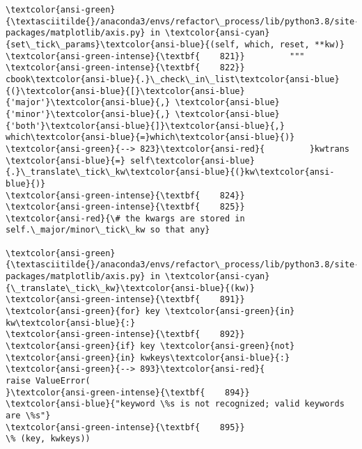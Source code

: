 \documentclass[11pt]{article}
\begin{document}
\begin{Verbatim}[commandchars=\\\{\}, frame=single, framerule=2mm, rulecolor=\color{outerrorbackground}]
\textcolor{ansi-green}{\textasciitilde{}/anaconda3/envs/refactor\_process/lib/python3.8/site-packages/matplotlib/axis.py} in \textcolor{ansi-cyan}{set\_tick\_params}\textcolor{ansi-blue}{(self, which, reset, **kw)}
\textcolor{ansi-green-intense}{\textbf{    821}}         """
\textcolor{ansi-green-intense}{\textbf{    822}}         cbook\textcolor{ansi-blue}{.}\_check\_in\_list\textcolor{ansi-blue}{(}\textcolor{ansi-blue}{[}\textcolor{ansi-blue}{'major'}\textcolor{ansi-blue}{,} \textcolor{ansi-blue}{'minor'}\textcolor{ansi-blue}{,} \textcolor{ansi-blue}{'both'}\textcolor{ansi-blue}{]}\textcolor{ansi-blue}{,} which\textcolor{ansi-blue}{=}which\textcolor{ansi-blue}{)}
\textcolor{ansi-green}{--> 823}\textcolor{ansi-red}{         }kwtrans \textcolor{ansi-blue}{=} self\textcolor{ansi-blue}{.}\_translate\_tick\_kw\textcolor{ansi-blue}{(}kw\textcolor{ansi-blue}{)}
\textcolor{ansi-green-intense}{\textbf{    824}} 
\textcolor{ansi-green-intense}{\textbf{    825}}         \textcolor{ansi-red}{\# the kwargs are stored in self.\_major/minor\_tick\_kw so that any}

\textcolor{ansi-green}{\textasciitilde{}/anaconda3/envs/refactor\_process/lib/python3.8/site-packages/matplotlib/axis.py} in \textcolor{ansi-cyan}{\_translate\_tick\_kw}\textcolor{ansi-blue}{(kw)}
\textcolor{ansi-green-intense}{\textbf{    891}}         \textcolor{ansi-green}{for} key \textcolor{ansi-green}{in} kw\textcolor{ansi-blue}{:}
\textcolor{ansi-green-intense}{\textbf{    892}}             \textcolor{ansi-green}{if} key \textcolor{ansi-green}{not} \textcolor{ansi-green}{in} kwkeys\textcolor{ansi-blue}{:}
\textcolor{ansi-green}{--> 893}\textcolor{ansi-red}{                 raise ValueError(
}\textcolor{ansi-green-intense}{\textbf{    894}}                     \textcolor{ansi-blue}{"keyword \%s is not recognized; valid keywords are \%s"}
\textcolor{ansi-green-intense}{\textbf{    895}}                     \% (key, kwkeys))


\end{Verbatim}
\end{document}
